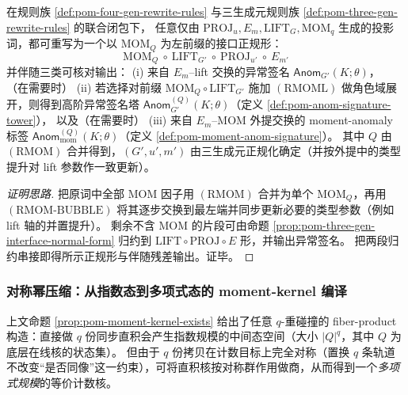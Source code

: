 \begin{proposition}\label{prop:pom-mom-interface-normal-form}
在规则族 \ref{def:pom-four-gen-rewrite-rules} 与三生成元规则族 \ref{def:pom-three-gen-rewrite-rules} 的联合闭包下，
任意仅由 \(\mathrm{PROJ}_u,E_m,\mathrm{LIFT}_G,\mathrm{MOM}_q\) 生成的投影词，都可重写为一个以 \(\mathrm{MOM}_Q\) 为左前缀的接口正规形：
$$
\boxed{\;
\mathrm{MOM}_Q\ \circ\ \mathrm{LIFT}_{G'}\ \circ\ \mathrm{PROJ}_{u'}\ \circ\ E_{m'}
\;}
$$
并伴随三类可核对输出：
(i) 来自 \(E_m\)--lift 交换的异常签名 \(\mathsf{Anom}_{G'}(K;\theta)\)，
（在需要时）
(ii) 若选择对前缀 \(\mathrm{MOM}_Q\circ \mathrm{LIFT}_{G'}\) 施加 \((\mathrm{RMOML})\) 做角色域展开，则得到高阶异常签名塔 \(\mathsf{Anom}^{(Q)}_{G'}(K;\theta)\)（定义 \ref{def:pom-anom-signature-tower}），
以及（在需要时）
(iii) 来自 \(E_m\)--\(\mathrm{MOM}\) 外提交换的 moment-anomaly 标签 \(\mathsf{Anom}^{(Q)}_{\mathrm{mom}}(K;\theta)\)（定义 \ref{def:pom-moment-anom-signature}）。
其中 \(Q\) 由 \((\mathrm{RMOM})\) 合并得到，\((G',u',m')\) 由三生成元正规化确定（并按外提中的类型提升对 lift 参数作一致更新）。
\end{proposition}

\begin{proof}[证明思路]
把原词中全部 \(\mathrm{MOM}\) 因子用 \((\mathrm{RMOM})\) 合并为单个 \(\mathrm{MOM}_Q\)，再用 \((\mathrm{RMOM\text{-}BUBBLE})\) 将其逐步交换到最左端并同步更新必要的类型参数（例如 lift 轴的并置提升）。
剩余不含 \(\mathrm{MOM}\) 的片段可由命题 \ref{prop:pom-three-gen-interface-normal-form} 归约到 \(\mathrm{LIFT}\circ\mathrm{PROJ}\circ E\) 形，并输出异常签名。
把两段归约串接即得所示正规形与伴随残差输出。证毕。
\end{proof}

\subsubsection{对称幂压缩：从指数态到多项式态的 moment-kernel 编译}\label{subsec:pom-moment-symmetric-power}

上文命题 \ref{prop:pom-moment-kernel-exists} 给出了任意 \(q\)-重碰撞的 fiber-product 构造：直接做 \(q\) 份同步直积会产生指数规模的中间态空间（大小 \(|Q|^q\)，其中 \(Q\) 为底层在线核的状态集）。
但由于 \(q\) 份拷贝在计数目标上完全对称（置换 \(q\) 条轨道不改变“是否同像”这一约束），可将直积核按对称群作用做商，从而得到一个\emph{多项式规模}的等价计数核。

